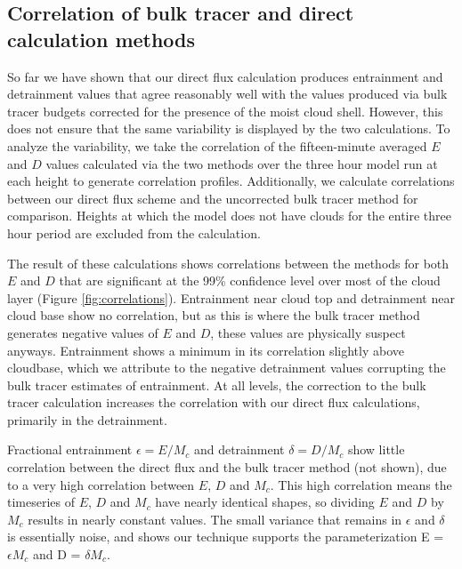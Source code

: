 \documentclass[12pt]{article}
\begin{document}

\subsection{Correlation of bulk tracer and direct calculation methods}

So far we have shown that our direct flux calculation produces entrainment and
detrainment values that agree reasonably well with the values produced via 
bulk tracer budgets corrected for the presence of the moist cloud shell.  
However, this does not ensure that the same variability is displayed by the two 
calculations.  To analyze the variability, we take the correlation of the 
fifteen-minute averaged $E$ and $D$ values calculated via the two methods over 
the three hour model run at each height to generate correlation profiles.  
Additionally, we calculate correlations between our direct flux scheme and 
the uncorrected bulk tracer method for comparison.  Heights at which the model 
does not have clouds for the entire three hour period are excluded from the 
calculation.  

The result of these calculations shows correlations between the methods for 
both $E$ and $D$ that are significant at the 99\% confidence level over most 
of the cloud layer (Figure \ref{fig:correlations}).  Entrainment near cloud top
and detrainment near cloud base show no correlation, but as this is where the 
bulk tracer method generates negative values of $E$ and $D$, these values are 
physically suspect anyways.  Entrainment shows a minimum in its correlation 
slightly above cloudbase, which we attribute to the negative detrainment values 
corrupting the bulk tracer estimates of entrainment.  At all levels, the 
correction to the bulk tracer calculation increases the correlation with our 
direct flux calculations, primarily in the detrainment. 

Fractional entrainment $\epsilon = E/M_c$ and detrainment $\delta = D/M_c$ show 
little correlation between the direct flux and the bulk tracer method (not 
shown), due to a very high correlation between $E$, $D$ and $M_c$.  This high 
correlation means the timeseries of $E$, $D$ and $M_c$ have nearly identical 
shapes, so dividing $E$ and $D$ by $M_c$ results in nearly constant values. The
small variance that remains in $\epsilon$ and $\delta$ is essentially noise, 
and shows our technique supports the parameterization E = $\epsilon M_c$ and 
D = $\delta M_c$.
\end{document}
